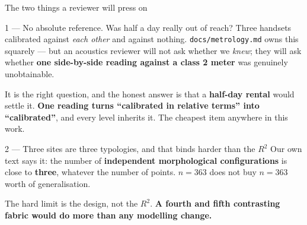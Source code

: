\documentclass[aspectratio=169,10pt]{beamer}
\newcommand{\up}[1]{\textcolor{good}{\textbf{#1}}}
\newcommand{\rr}{$R^2$}
\begin{document}
\begin{frame}{The two things a reviewer will press on}
  \begin{alertblock}{1 --- No absolute reference. Was half a day really out of reach?}
    Three handsets calibrated against \emph{each other} and against nothing.
    \texttt{docs/metrology.md} owns this squarely --- but an acoustics reviewer
    will not ask whether we \emph{knew}; they will ask whether \textbf{one
    side-by-side reading against a class 2 meter} was genuinely unobtainable.
    \vspace{.3em}

    It is the right question, and the honest answer is that a \textbf{half-day
    rental} would settle it. \up{One reading turns ``calibrated in relative
    terms'' into ``calibrated''}, and every level inherits it. The cheapest item
    anywhere in this work.
  \end{alertblock}
  \vspace{.2em}
  \begin{alertblock}{2 --- Three sites are three typologies, and that binds harder than the \rr{}}
    Our own text says it: the number of \textbf{independent morphological
    configurations} is close to \textbf{three}, whatever the number of points.
    $n = 363$ does not buy $n = 363$ worth of generalisation.
    \vspace{.3em}

    The hard limit is the design, not the \rr{}. \textbf{A fourth and fifth
    contrasting fabric would do more than any modelling change.}
  \end{alertblock}
\end{frame}
\end{document}
